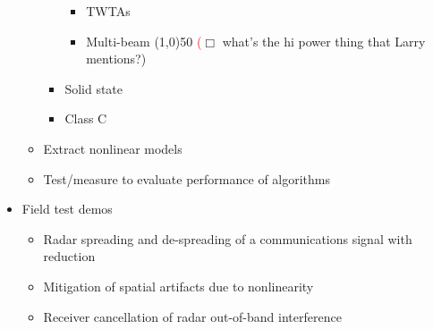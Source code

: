 \begin{itemize}
\begin{itemize}
\begin{itemize}
\begin{itemize}
\item TWTAs
\item Multi-beam \line(1,0){50}  \textcolor{red}($\Box$ what's the hi power thing that Larry mentions?)
\end{itemize}
\item Solid state
\item Class C
\end{itemize}
\item Extract nonlinear models
\item Test/measure to evaluate performance of algorithms
\end{itemize}
\item Field test demos
\begin{itemize}
\item Radar spreading and de-spreading of a communications signal with \PAR reduction
\item Mitigation of spatial artifacts due to \PA nonlinearity
\item Receiver cancellation of radar out-of-band interference
\end{itemize}
\end{itemize}
